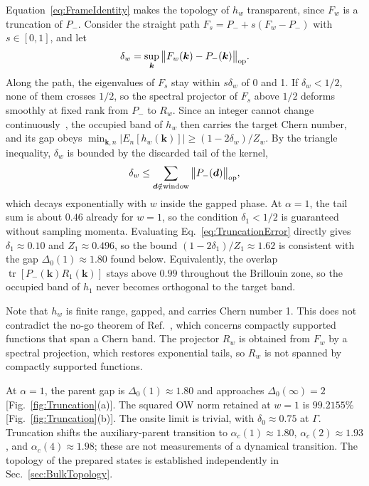 \documentclass[aps,prb,10pt,twocolumn,superscriptaddress,longbibliography,floatfix]{revtex4-2}
\newcommand{\bk}{\boldsymbol k}
\newcommand{\newtext}[1]{{\color{blue}#1}}
\begin{document}
{Equation~\eqref{eq:FrameIdentity} makes the topology of $h_w$ transparent, since $F_w$ is a truncation of $P_-$. Consider the straight path $F_s=P_-+s(F_w-P_-)$ with $s\in[0,1]$, and let
\begin{equation}
    \delta_w=\sup_{\bk}\big\|F_w(\bk)-P_-(\bk)\big\|_{\rm op}.
    \label{eq:TruncationError}
\end{equation}
Along the path, the eigenvalues of $F_s$ stay within $s\delta_w$ of 0 and 1. If $\delta_w<1/2$, none of them crosses $1/2$, so the spectral projector of $F_s$ above $1/2$ deforms smoothly at fixed rank from $P_-$ to $R_w$. Since an integer cannot change continuously~\cite{AvronSeilerSimon1983}, the occupied band of $h_w$ then carries the target Chern number, and its gap obeys $\min_{\bk,n}|E_n[h_w(\bk)]|\geq(1-2\delta_w)/Z_w$. By the triangle inequality, $\delta_w$ is bounded by the discarded tail of the kernel,
\begin{equation}
    \delta_w\leq\sum_{\boldsymbol d\notin\text{window}}\big\|P_-(\boldsymbol d)\big\|_{\rm op},
    \label{eq:TailBound}
\end{equation}
which decays exponentially with $w$ inside the gapped phase. At $\alpha=1$, the tail sum is about $0.46$ already for $w=1$, so the condition $\delta_1<1/2$ is guaranteed without sampling momenta. Evaluating Eq.~\eqref{eq:TruncationError} directly gives $\delta_1\approx0.10$ and $Z_1\approx0.496$, so the bound $(1-2\delta_1)/Z_1\approx1.62$ is consistent with the gap $\Delta_0(1)\approx1.80$ found below. Equivalently, the overlap $\operatorname{tr}[P_-(\bk)R_1(\bk)]$ stays above $0.99$ throughout the Brillouin zone, so the occupied band of $h_1$ never becomes orthogonal to the target band.

Note that $h_w$ is finite range, gapped, and carries Chern number 1. This does not contradict the no-go theorem of Ref.~\cite{DubailRead2015}, which concerns compactly supported functions that span a Chern band. The projector $R_w$ is obtained from $F_w$ by a spectral projection, which restores exponential tails, so $R_w$ is not spanned by compactly supported functions.
}

\newtext{At $\alpha=1$, the parent gap is $\Delta_0(1)\approx1.80$ and approaches $\Delta_0(\infty)=2$ [Fig.~\ref{fig:Truncation}(a)]. The squared OW norm retained at $w=1$ is $99.2155\%$ [Fig.~\ref{fig:Truncation}(b)]. The onsite limit is trivial, with $\delta_0\approx0.75$ at $\Gamma$. Truncation shifts the auxiliary-parent transition to $\alpha_c(1)\approx1.80$, $\alpha_c(2)\approx1.93$, and $\alpha_c(4)\approx1.98$; these are not measurements of a dynamical transition. The topology of the prepared states is established independently in Sec.~\ref{sec:BulkTopology}.}
\end{document}
